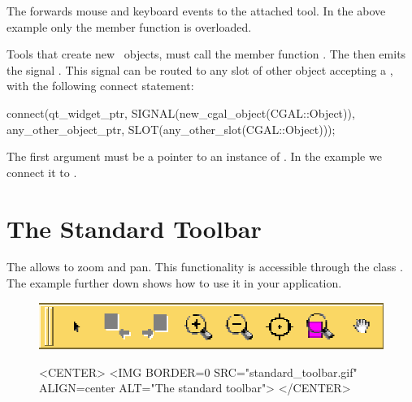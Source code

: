 The  forwards mouse and keyboard events to the attached tool.
In the above example only the  member function is overloaded.

Tools that create new \cgal\ objects, must call the member 
function . The
 then emits the signal
. This signal can be routed to
any slot of other object accepting a , with the
following connect statement:
\begin{ccExampleCode}
connect(qt_widget_ptr, SIGNAL(new_cgal_object(CGAL::Object)), 
        any_other_object_ptr, SLOT(any_other_slot(CGAL::Object)));
\end{ccExampleCode}

The first argument must be a pointer to an instance of .
In the example we connect it to .

\section{The Standard Toolbar}
\label{Qt_widget_standard_toolbar}

The  allows to zoom and pan. This functionality is 
accessible through the class . The 
example further down shows how to use it in your application.

\begin{figure}[h]
\begin{ccTexOnly}
\begin{center}
\includegraphics{standard_toolbar.eps} 
\end{center}
\end{ccTexOnly}
\begin{ccHtmlOnly}
<CENTER>
<IMG BORDER=0 SRC="standard_toolbar.gif"  ALIGN=center  ALT="The
standard toolbar">
</CENTER>
\end{ccHtmlOnly}
\end{figure}

